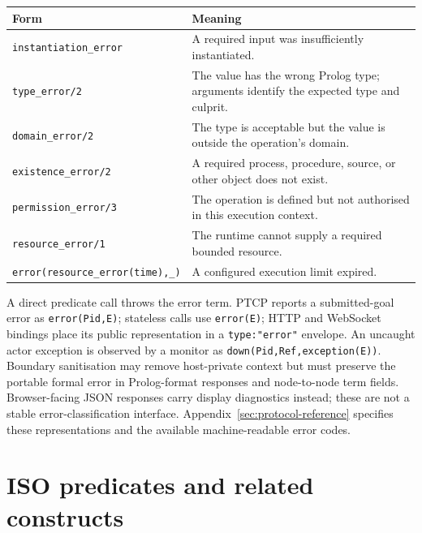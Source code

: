 \begin{center}
\small
\begin{tabularx}{\textwidth}{@{}p{}X@{}}
\toprule
Form & Meaning \\
\midrule
\texttt{instantiation\_\allowbreak{}error} & A required input was insufficiently instantiated. \\[0.4em]
\texttt{type\_\allowbreak{}error/\allowbreak{}2} & The value has the wrong Prolog type; arguments identify the expected type and culprit. \\[0.4em]
\texttt{domain\_\allowbreak{}error/\allowbreak{}2} & The type is acceptable but the value is outside the operation's domain. \\[0.4em]
\texttt{existence\_\allowbreak{}error/\allowbreak{}2} & A required process, procedure, source, or other object does not exist. \\[0.4em]
\texttt{permission\_\allowbreak{}error/\allowbreak{}3} & The operation is defined but not authorised in this execution context. \\[0.4em]
\texttt{resource\_\allowbreak{}error/\allowbreak{}1} & The runtime cannot supply a required bounded resource. \\[0.4em]
\texttt{error(\allowbreak{}resource\_\allowbreak{}error(\allowbreak{}time),\allowbreak{}\_\allowbreak{})} & A configured execution limit expired. \\
\bottomrule
\end{tabularx}
\end{center}

\noindent A direct predicate call throws the error term.  PTCP reports a submitted-goal
error as \texttt{error(\allowbreak{}Pid,\allowbreak{}E)}; stateless calls use
\texttt{error(\allowbreak{}E)}; HTTP and WebSocket bindings place its public representation
in a \texttt{type:"error"} envelope.  An uncaught actor exception is observed
by a monitor as \texttt{down(\allowbreak{}Pid,\allowbreak{}Ref,\allowbreak{}exception(\allowbreak{}E))}.  Boundary sanitisation may
remove host-private context but must preserve the portable formal error in
Prolog-format responses and node-to-node term fields. Browser-facing JSON
responses carry display diagnostics instead; these are not a stable
error-classification interface. Appendix~\ref{sec:protocol-reference}
specifies these representations and the available machine-readable error codes.


\section{ISO predicates and related constructs}

